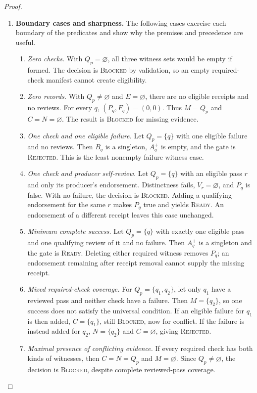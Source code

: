 \begin{proof}
\begin{enumerate}
\item \textbf{Boundary cases and sharpness.}
The following cases exercise each boundary of the predicates
and show why the premises and precedence are useful.
\begin{enumerate}
\item \emph{Zero checks.}
With $Q_p=\varnothing$, all three witness sets would be empty
if formed. The decision is \textsc{Blocked} by validation,
so an empty required-check manifest cannot create eligibility.
\item \emph{Zero records.}
With $Q_p\ne\varnothing$ and $E=\varnothing$,
there are no eligible receipts and no reviews.
For every $q$, $(P_q,F_q)=(0,0)$.
Thus $M=Q_p$ and $C=N=\varnothing$.
The result is \textsc{Blocked} for missing evidence.
\item \emph{One check and one eligible failure.}
Let $Q_p=\{q\}$ with one eligible failure and no reviews.
Then $B_q$ is a singleton, $A_q^+$ is empty,
and the gate is \textsc{Rejected}.
This is the least nonempty failure witness case.
\item \emph{One check and producer self-review.}
Let $Q_p=\{q\}$ with an eligible pass $r$ and only its
producer's endorsement.
Distinctness fails, $V_r=\varnothing$, and $P_q$ is false.
With no failure, the decision is \textsc{Blocked}.
Adding a qualifying endorsement for the same $r$
makes $P_q$ true and yields \textsc{Ready}.
An endorsement of a different receipt leaves this case unchanged.
\item \emph{Minimum complete success.}
Let $Q_p=\{q\}$ with exactly one eligible pass and one
qualifying review of it and no failure.
Then $A_q^+$ is a singleton and the gate is \textsc{Ready}.
Deleting either required witness removes $P_q$;
an endorsement remaining after receipt removal cannot
supply the missing receipt.
\item \emph{Mixed required-check coverage.}
For $Q_p=\{q_1,q_2\}$, let only $q_1$ have a reviewed pass
and neither check have a failure.
Then $M=\{q_2\}$, so one success does not
satisfy the universal condition.
If an eligible failure for $q_1$ is then added,
$C=\{q_1\}$, still \textsc{Blocked}, now for conflict.
If the failure is instead added for $q_2$,
$N=\{q_2\}$ and $C=\varnothing$, giving \textsc{Rejected}.
\item \emph{Maximal presence of conflicting evidence.}
If every required check has both kinds of witnesses,
then $C=N=Q_p$ and $M=\varnothing$.
Since $Q_p\ne\varnothing$, the decision is
\textsc{Blocked}, despite complete reviewed-pass coverage.

\end{enumerate}
\end{enumerate}
\end{proof}
